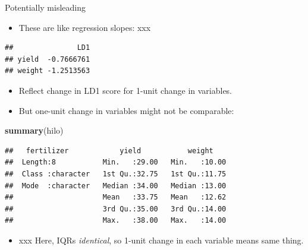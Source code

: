 \documentclass[ignorenonframetext,]{beamer}
\newenvironment{Shaded}{\begin{snugshade}}{\end{snugshade}}
\newcommand{\FloatTok}[1]{\textcolor[rgb]{0.00,0.00,0.81}{#1}}
\newcommand{\KeywordTok}[1]{\textcolor[rgb]{0.13,0.29,0.53}{\textbf{#1}}}
\newcommand{\NormalTok}[1]{#1}
\newcommand{\OperatorTok}[1]{\textcolor[rgb]{0.81,0.36,0.00}{\textbf{#1}}}
\providecommand{\tightlist}{%
  \setlength{\itemsep}{0pt}\setlength{\parskip}{0pt}}
\begin{document}
\begin{frame}[fragile]{Potentially misleading}
\protect\hypertarget{potentially-misleading}{}

\begin{itemize}
\tightlist
\item
  These are like regression slopes: xxx
\end{itemize}

\footnotesize

\begin{Shaded}
\end{Shaded}

\begin{verbatim}
##               LD1
## yield  -0.7666761
## weight -1.2513563
\end{verbatim}

\normalsize

\begin{itemize}
\item
  Reflect change in LD1 score for 1-unit change in variables.
\item
  But one-unit change in variables might not be comparable:
\end{itemize}

\footnotesize

\begin{Shaded}
\begin{Highlighting}[]
\KeywordTok{summary}\NormalTok{(hilo)}
\end{Highlighting}
\end{Shaded}

\begin{verbatim}
##   fertilizer            yield           weight     
##  Length:8           Min.   :29.00   Min.   :10.00  
##  Class :character   1st Qu.:32.75   1st Qu.:11.75  
##  Mode  :character   Median :34.00   Median :13.00  
##                     Mean   :33.75   Mean   :12.62  
##                     3rd Qu.:35.00   3rd Qu.:14.00  
##                     Max.   :38.00   Max.   :14.00
\end{verbatim}

\normalsize

\begin{itemize}
\tightlist
\item
  xxx Here, IQRs \emph{identical}, so 1-unit change in each variable
  means same thing.
\end{itemize}

\end{frame}
\end{document}

